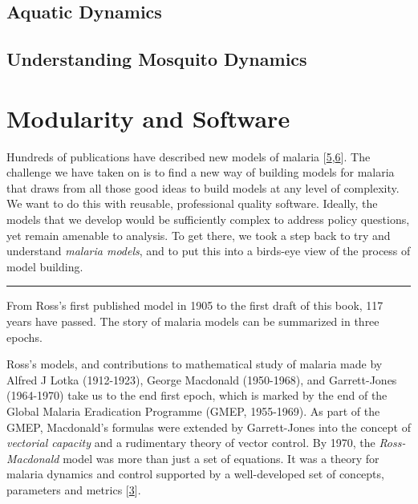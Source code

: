 \documentclass[
]{book}
\begin{document}
\hypertarget{aquatic-dynamics}{%
\section{Aquatic Dynamics}\label{aquatic-dynamics}}

\hypertarget{understanding-mosquito-dynamics}{%
\section{Understanding Mosquito Dynamics}\label{understanding-mosquito-dynamics}}

\hypertarget{modularity-and-software}{%
\chapter{Modularity and Software}\label{modularity-and-software}}

Hundreds of publications have described new models of malaria {[}\protect\hyperlink{ref-ReinerRCJ2013SystematicReview}{5},\protect\hyperlink{ref-SmithNR2018AgentbasedModels}{6}{]}. The challenge we have taken on is to find a new way of building models for malaria that draws from all those good ideas to build models at any level of complexity. We want to do this with reusable, professional quality software. Ideally, the models that we develop would be sufficiently complex to address policy questions, yet remain amenable to analysis. To get there, we took a step back to try and understand \emph{malaria models}, and to put this into a birds-eye view of the process of model building.

\begin{center}\rule{0.5\linewidth}{0.5pt}\end{center}

From Ross's first published model in 1905 to the first draft of this book, 117 years have passed. The story of malaria models can be summarized in three epochs.

Ross's models, and contributions to mathematical study of malaria made by Alfred J Lotka (1912-1923), George Macdonald (1950-1968), and Garrett-Jones (1964-1970) take us to the end first epoch, which is marked by the end of the Global Malaria Eradication Programme (GMEP, 1955-1969). As part of the GMEP, Macdonald's formulas were extended by Garrett-Jones into the concept of \emph{vectorial capacity} and a rudimentary theory of vector control. By 1970, the \emph{Ross-Macdonald} model was more than just a set of equations. It was a theory for malaria dynamics and control supported by a well-developed set of concepts, parameters and metrics {[}\protect\hyperlink{ref-SmithDL2012_RossMacdonald}{3}{]}.
\end{document}
